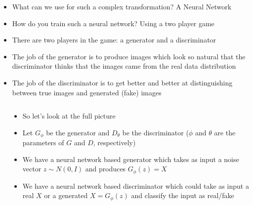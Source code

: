 {\begin{frame}
\begin{columns}
		\begin{overlayarea}{\textwidth}{\textheight}
			\begin{itemize}[<+->]\justifying
				\item What can we use for such a complex transformation? \onslide<2-> \alert<2> {A Neural Network}
				\item<3-> How do you train such a neural network? \onslide<4-> \alert<4>{Using a two player game} 
				\item<5-> There are two players in the game: \onslide<6-> \alert<6>{a generator} \onslide<7-> and \alert<7>{a discriminator}
				\item<8-> The job of the generator is to produce images which look so natural that the discriminator thinks that the images came from the real data distribution
				\item<9-> The job of the discriminator is to get better and better at distinguishing between true images and generated (fake) images
			\end{itemize}
		\end{overlayarea}
	\end{columns}
\end{frame}


\begin{frame}
	\begin{columns}
		\begin{overlayarea}{\textwidth}{\textheight}
			\vspace*{10mm}
			\begin{center}
						
			\end{center}		
		\end{overlayarea}

		\begin{overlayarea}{\textwidth}{\textheight}
			\begin{itemize}[<+->]\justifying
				\item So let's look at the full picture
				\item Let $G_\phi$ be the generator and $D_\theta$ be the discriminator ($\phi$ and $\theta$ are the parameters of $G$ and $D$, respectively)
				\item We have a neural network based generator which takes as input a noise vector $z \sim N(0, I)$ and produces $G_\phi(z) = X$
				\item We have a neural network based discriminator which could take as input a real $X$ or a generated $X = G_\phi(z)$ and classify the input as real/fake
			\end{itemize}
		\end{overlayarea}
	\end{columns}
\end{frame}

}
